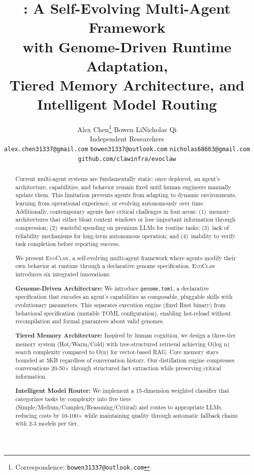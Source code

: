 \documentclass{article}
\title{\evoclaw{}: A Self-Evolving Multi-Agent Framework \\ with Genome-Driven Runtime Adaptation, \\ Tiered Memory Architecture, and Intelligent Model Routing}
\author{
  Alex Chen\thanks{Correspondence: \texttt{bowen31337@outlook.com}} \quad Bowen Li\footnotemark[1] \quad Nicholas Qi\footnotemark[1] \\[0.3em]
  Independent Researchers \\
  \texttt{alex.chen31337@gmail.com} \quad \texttt{bowen31337@outlook.com} \quad \texttt{nicholas68663@gmail.com} \\
  \texttt{github.com/clawinfra/evoclaw}
}
\newcommand{\evoclaw}{\textsc{EvoClaw}}
\newcommand{\genome}{\texttt{genome.toml}}
\begin{document}
\maketitle


\begin{abstract}
Current multi-agent systems are fundamentally static: once deployed, an agent's architecture, capabilities, and behavior remain fixed until human engineers manually update them. This limitation prevents agents from adapting to dynamic environments, learning from operational experience, or evolving autonomously over time. Additionally, contemporary agents face critical challenges in four areas: (1)~memory architectures that either bloat context windows or lose important information through compression; (2)~wasteful spending on premium LLMs for routine tasks; (3)~lack of reliability mechanisms for long-term autonomous operation; and (4)~inability to verify task completion before reporting success.

We present \evoclaw{}, a self-evolving multi-agent framework where agents modify their own behavior at runtime through a declarative genome specification. \evoclaw{} introduces six integrated innovations:

\textbf{Genome-Driven Architecture:} We introduce \genome{}, a declarative specification that encodes an agent's capabilities as composable, pluggable skills with evolutionary parameters. This separates execution engine (fixed Rust binary) from behavioral specification (mutable TOML configuration), enabling hot-reload without recompilation and formal guarantees about valid genomes.

\textbf{Tiered Memory Architecture:} Inspired by human cognition, we design a three-tier memory system (Hot/Warm/Cold) with tree-structured retrieval achieving O(log n) search complexity compared to O(n) for vector-based RAG. Core memory stays bounded at 5KB regardless of conversation history. Our distillation engine compresses conversations 20-50$\times$ through structured fact extraction while preserving critical information.

\textbf{Intelligent Model Router:} We implement a 15-dimension weighted classifier that categorizes tasks by complexity into five tiers (Simple/Medium/Complex/Reasoning/Critical) and routes to appropriate LLMs, reducing costs by 10-100$\times$ while maintaining quality through automatic fallback chains with 2-3 models per tier.


\end{abstract}
\end{document}
